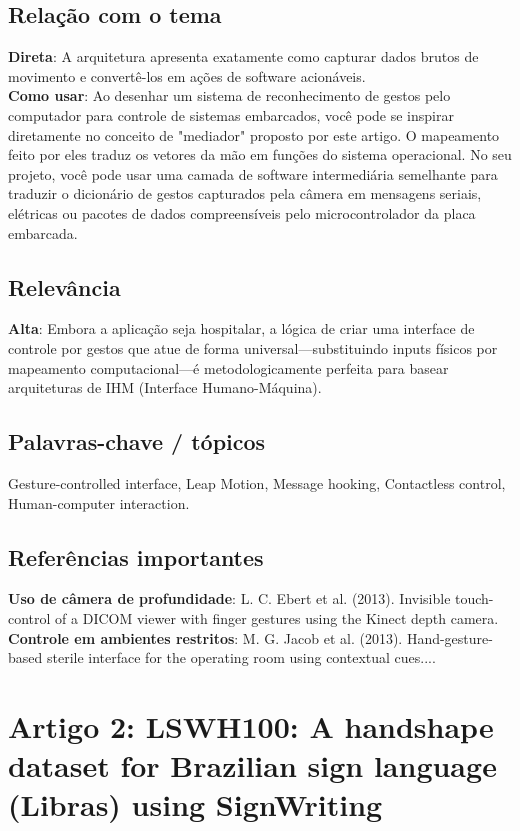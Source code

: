 \documentclass[12pt, a4paper]{article}
\begin{document}
\subsection{Relação com o tema}
\textbf{Direta}: A arquitetura apresenta exatamente como capturar dados brutos de movimento e convertê-los em ações de software acionáveis.\\
\textbf{Como usar}: Ao desenhar um sistema de reconhecimento de gestos pelo computador para controle de sistemas embarcados, você pode se inspirar diretamente no conceito de "mediador" proposto por este artigo. O mapeamento feito por eles traduz os vetores da mão em funções do sistema operacional. No seu projeto, você pode usar uma camada de software intermediária semelhante para traduzir o dicionário de gestos capturados pela câmera em mensagens seriais, elétricas ou pacotes de dados compreensíveis pelo microcontrolador da placa embarcada.\\
\subsection{Relevância}
\textbf{Alta}: Embora a aplicação seja hospitalar, a lógica de criar uma interface de controle por gestos que atue de forma universal—substituindo inputs físicos por mapeamento computacional—é metodologicamente perfeita para basear arquiteturas de IHM (Interface Humano-Máquina).\\
\subsection{Palavras-chave / tópicos}
Gesture-controlled interface, Leap Motion, Message hooking, Contactless control, Human-computer interaction.\\
\subsection{Referências importantes}
\textbf{Uso de câmera de profundidade}: L. C. Ebert et al. (2013). Invisible touch-control of a DICOM viewer with finger gestures using the Kinect depth camera.\\
\textbf{Controle em ambientes restritos}: M. G. Jacob et al. (2013). Hand-gesture-based sterile interface for the operating room using contextual cues....\\
\newpage
\section{Artigo 2: LSWH100: A handshape dataset for Brazilian sign language (Libras) using SignWriting}
\end{document}
